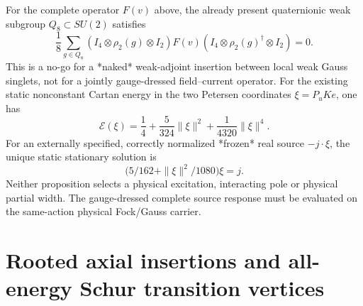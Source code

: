 \documentclass[12pt,a4paper]{article}
\begin{document}
\begin{proposition}
\label{p10:prop:v368-naked-Gauss-and-frozen-source}
For the complete operator $F(v)$ above, the already present quaternionic
weak subgroup $Q_8\subset SU(2)$ satisfies
\[
 \frac18\sum_{g\in Q_8}
 (I_4\otimes\rho_2(g)\otimes I_2)F(v)
 (I_4\otimes\rho_2(g)^\dagger\otimes I_2)=0.
\]
This is a no-go for a *naked* weak-adjoint insertion between local weak
Gauss singlets, not for a jointly gauge-dressed field--current operator.
For the existing static nonconstant Cartan energy in the two Petersen
coordinates $\xi=P_uKe$, one has
\[
 \mathcal E(\xi)=\frac14+\frac5{324}\|\xi\|^2
 +\frac1{4320}\|\xi\|^4.
\]
For an externally specified, correctly normalized *frozen* real source
$-j\cdot\xi$, the unique static stationary solution is
\[
 \bigl(5/162+\|\xi\|^2/1080\bigr)\xi=j.
\]
Neither proposition selects a physical excitation, interacting pole or
physical partial width. The gauge-dressed complete source response must
be evaluated on the same-action physical Fock/Gauss carrier.
\end{proposition}


\section{Rooted axial insertions and all-energy Schur transition vertices}
\label{p10:sec:v375-rooted-dressed-current}
\end{document}
